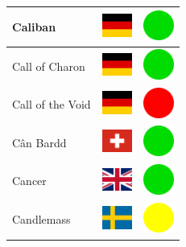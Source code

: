 \documentclass[12pt, a4paper, twoside]{report}
\begin{document}
\begin{center}
\begin{longtable}{|p{5cm}|p{2cm}|p{2cm}|}
 Caliban                                                    & \includegraphics[width=1cm]{../img/flags/de} &   \includegraphics[width=1cm]{../likes/y} \\ \hline
 Call of Charon                                             & \includegraphics[width=1cm]{../img/flags/de} &   \includegraphics[width=1cm]{../likes/y} \\ \hline
 Call of the Void                                           & \includegraphics[width=1cm]{../img/flags/de} &   \includegraphics[width=1cm]{../likes/n} \\ \hline
 Cân Bardd                                                  & \includegraphics[width=1cm]{../img/flags/ch} &   \includegraphics[width=1cm]{../likes/y} \\ \hline
 Cancer                                                     & \includegraphics[width=1cm]{../img/flags/gb} &   \includegraphics[width=1cm]{../likes/y} \\ \hline
 Candlemass                                                 & \includegraphics[width=1cm]{../img/flags/se} &   \includegraphics[width=1cm]{../likes/m} \\ \hline

\end{longtable}
\end{center}
\end{document}
